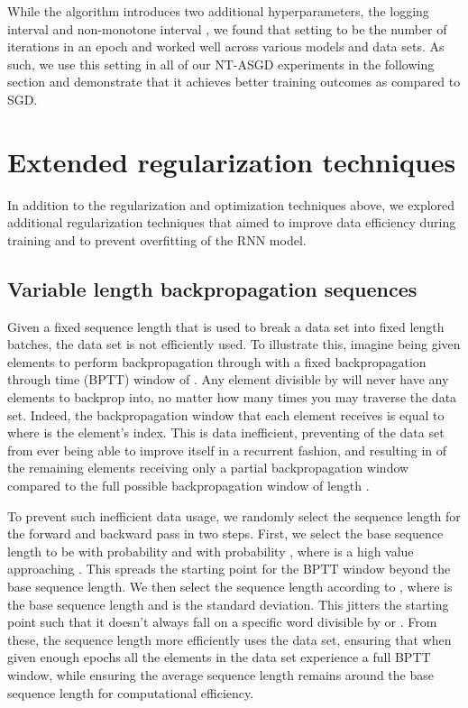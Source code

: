 \documentclass{article}
\begin{document}
While the algorithm introduces two additional hyperparameters, the logging interval  and non-monotone interval , we found that setting  to be the number of iterations in an epoch and  worked well across various models and data sets. As such, we use this setting in all of our NT-ASGD experiments in the following section and demonstrate that it achieves better training outcomes as compared to SGD.

\section{Extended regularization techniques}

In addition to the regularization and optimization techniques above, we explored additional regularization techniques that aimed to improve data efficiency during training and to prevent overfitting of the RNN model.

\subsection{Variable length backpropagation sequences}

Given a fixed sequence length that is used to break a data set into fixed length batches, the data set is not efficiently used.
To illustrate this, imagine being given  elements to perform backpropagation through with a fixed backpropagation through time (BPTT) window of .
Any element divisible by  will never have any elements to backprop into, no matter how many times you may traverse the data set.
Indeed, the backpropagation window that each element receives is equal to  where  is the element's index.
This is data inefficient, preventing  of the data set from ever being able to improve itself in a recurrent fashion, and resulting in  of the remaining elements receiving only a partial backpropagation window compared to the full possible backpropagation window of length .

To prevent such inefficient data usage, we randomly select the sequence length for the forward and backward pass in two steps.
First, we select the base sequence length to be  with probability  and  with probability , where  is a high value approaching .
This spreads the starting point for the BPTT window beyond the base sequence length.
We then select the sequence length according to , where  is the base sequence length and  is the standard deviation.
This jitters the starting point such that it doesn't always fall on a specific word divisible by  or .
From these, the sequence length more efficiently uses the data set, ensuring that when given enough epochs all the elements in the data set experience a full BPTT window, while ensuring the average sequence length remains around the base sequence length for computational efficiency.
\end{document}
